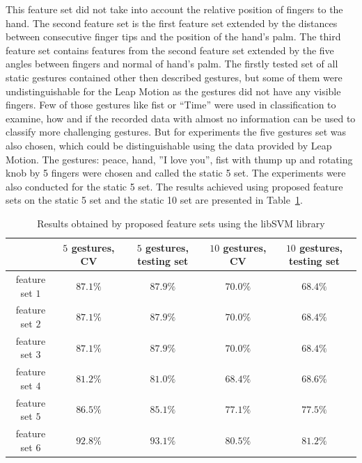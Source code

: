This feature set did not take into account the relative position of fingers to the hand.
The second feature set is the first feature set extended by the distances between consecutive finger tips and the position of the hand's palm.
The third feature set contains features from the second feature set extended by the five angles between fingers and normal of hand's palm.
The firstly tested set of all static gestures contained other then described gestures, but some of them were undistinguishable for the Leap Motion as the gestures did not have any visible fingers.
Few of those gestures like fist or ``Time'' were used in classification to examine, how and if the recorded data with almost no information can be used to classify more challenging gestures.
But for experiments the five gestures set was also chosen, which could be distinguishable using the data provided by Leap Motion. 
The gestures: peace, hand, ''I love you'', fist with thump up and rotating knob by 5 fingers were chosen and called the static 5 set.
The experiments were also conducted for the static 5 set.
The results achieved using proposed feature sets on the static 5 set and the static 10 set are presented in Table~\ref{staticfeat}.

\begin{table}[htp!]
	\label{staticfeat}
	\caption{Results obtained by proposed feature sets using the libSVM library}
    \begin{tabular}{ccccc}
    \hline
    ~                                                   & $5$ gestures, CV & $5$ gestures, testing set & $10$ gestures, CV  & $10$ gestures, testing set \\ \hline
    feature set $1$                     & $87.1\%$ & $87.9\%$ & $70.0\%$ & $68.4\%$   \\ \hline
    feature set $2$                     & $87.1\%$ & $87.9\%$ & $70.0\%$ & $68.4\%$          \\ \hline
    feature set $3$                     & $87.1\%$ & $87.9\%$ & $70.0\%$ & $68.4\%$           \\ \hline
    feature set $4$                     & $81.2\%$ & $81.0\%$ & $68.4\%$ & $68.6\%$          \\ \hline
    feature set $5$                     & $86.5\%$ & $85.1\%$ & $77.1\%$ & $77.5\%$          \\ \hline
    feature set $6$                     & $92.8\%$ & $93.1\%$ & $80.5\%$ & $81.2\%$           \\ \hline
    \end{tabular}
\end{table}

